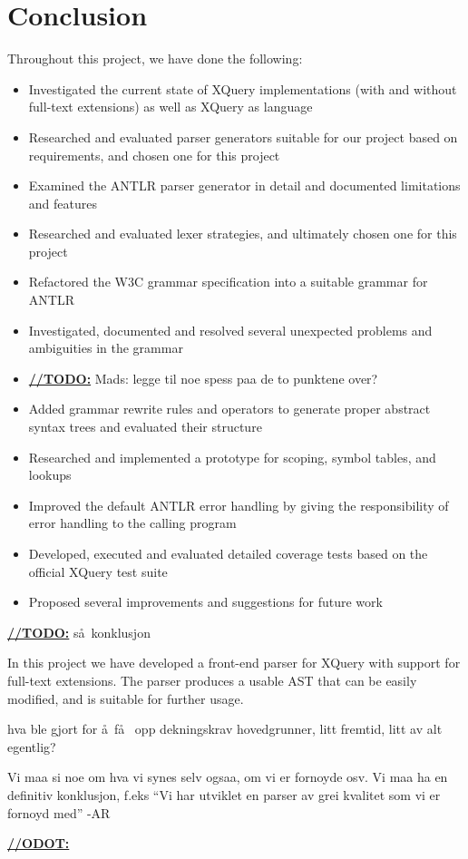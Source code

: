 \chapter{Conclusion}
Throughout this project, we have done the following:
\begin{itemize}
  \item Investigated the current state of XQuery implementations (with and
  without full-text extensions) as well as XQuery as language
  \item Researched and evaluated parser generators suitable
  for our project based on requirements, and chosen one for this project
  \item Examined the ANTLR parser generator in detail and documented
  limitations and features
  \item Researched and evaluated lexer strategies, and ultimately chosen one
  for this project
  \item Refactored the W3C grammar specification into a suitable grammar for
  ANTLR
  \item Investigated, documented and resolved several unexpected problems and
  ambiguities in the grammar
  \item \underline{\textbf{\LARGE //TODO:}} Mads: legge til noe spess paa de to
  punktene over?
  \item Added grammar rewrite rules and operators to generate proper abstract
  syntax trees and evaluated their structure
  \item Researched and implemented a prototype for scoping, symbol tables, and
  lookups
  \item Improved the default ANTLR error handling by giving the responsibility
  of error handling to the calling program
  \item Developed, executed and evaluated detailed coverage tests based on the
  official XQuery test suite
  \item Proposed several improvements and suggestions for future work
\end{itemize}


\underline{\textbf{\LARGE //TODO:}}
s\aa~konklusjon

In this project we have developed a front-end parser for XQuery with support for
full-text extensions. The parser produces a usable AST that can be easily
modified, and is suitable for further usage.

hva ble gjort for \aa ~f\aa~ opp dekningskrav hovedgrunner, litt fremtid, litt
av alt egentlig? 

Vi maa si noe om hva vi synes selv ogsaa, om vi er fornoyde osv. Vi maa ha en
definitiv konklusjon, f.eks ``Vi har utviklet en parser av grei kvalitet som vi
er fornoyd med'' 
-AR

\underline{\textbf{\LARGE //ODOT:}}